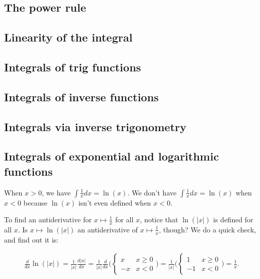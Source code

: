 \subsection*{The power rule}

\subsection*{Linearity of the integral}

\subsection*{Integrals of trig functions}

\subsection*{Integrals of inverse functions}

\subsection*{Integrals via inverse trigonometry}

\subsection*{Integrals of exponential and logarithmic functions}

When $x > 0$, we have $\int \frac{1}{x} dx = \ln(x)$. We don't have $\int \frac{1}{x} dx = \ln(x)$ when $x < 0$ because $\ln(x)$ isn't even defined when $x < 0$.

To find an antiderivative for $x \mapsto \frac{1}{x}$ for all $x$, notice that $\ln(|x|)$ is defined for all $x$. Is $x \mapsto \ln(|x|)$ an antiderivative of $x \mapsto \frac{1}{x}$, though? We do a quick check, and find out it is:

\begin{align*}
    \frac{d}{dx} \ln(|x|) = 
    \frac{1}{|x|} \frac{d|x|}{dx} =
    \frac{1}{|x|} \frac{d}{dx}
    \Bigg(
    \begin{cases}
        x & x \geq 0 \\
        -x & x < 0
    \end{cases}
    \Bigg)
    =
    \frac{1}{|x|} 
    \Bigg(
    \begin{cases}
        1 & x \geq 0 \\
        -1 & x < 0
    \end{cases}
    \Bigg)
    = \frac{1}{x}.
\end{align*}


